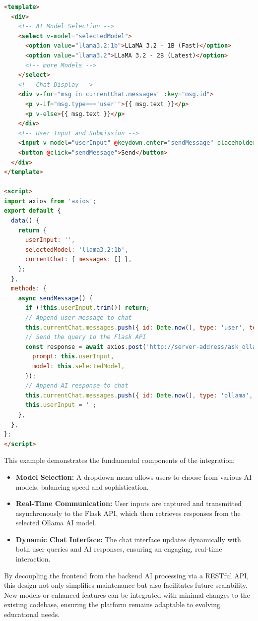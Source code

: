 \begin{lstlisting}[language=html, caption={Abbreviated Vue.js Integration Example}, frame=single]
<template>
  <div>
    <!-- AI Model Selection -->
    <select v-model="selectedModel">
      <option value="llama3.2:1b">LLaMA 3.2 - 1B (Fast)</option>
      <option value="llama3.2">LLaMA 3.2 - 2B (Latest)</option>
      <!-- more Models -->
    </select>
    <!-- Chat Display -->
    <div v-for="msg in currentChat.messages" :key="msg.id">
      <p v-if="msg.type==='user'">{{ msg.text }}</p>
      <p v-else>{{ msg.text }}</p>
    </div>
    <!-- User Input and Submission -->
    <input v-model="userInput" @keydown.enter="sendMessage" placeholder="Ask the AI question..." />
    <button @click="sendMessage">Send</button>
  </div>
</template>

<script>
import axios from 'axios';
export default {
  data() {
    return {
      userInput: '',
      selectedModel: 'llama3.2:1b',
      currentChat: { messages: [] },
    };
  },
  methods: {
    async sendMessage() {
      if (!this.userInput.trim()) return;
      // Append user message to chat
      this.currentChat.messages.push({ id: Date.now(), type: 'user', text: this.userInput });
      // Send the query to the Flask API
      const response = await axios.post('http://server-address/ask_ollama', {
        prompt: this.userInput,
        model: this.selectedModel,
      });
      // Append AI response to chat
      this.currentChat.messages.push({ id: Date.now(), type: 'ollama', text: response.data.choices[0].text });
      this.userInput = '';
    },
  },
};
</script>
\end{lstlisting}

This example demonstrates the fundamental components of the integration:
\begin{itemize}
  \item \textbf{Model Selection:} A dropdown menu allows users to choose from various AI models, balancing speed and sophistication.
  \item \textbf{Real-Time Communication:} User inputs are captured and transmitted asynchronously to the Flask API, which then retrieves responses from the selected Ollama AI model.
  \item \textbf{Dynamic Chat Interface:} The chat interface updates dynamically with both user queries and AI responses, ensuring an engaging, real-time interaction.
\end{itemize}

By decoupling the frontend from the backend AI processing via a RESTful API, this design not only simplifies maintenance but also facilitates future scalability. New models or enhanced features can be integrated with minimal changes to the existing codebase, ensuring the platform remains adaptable to evolving educational needs.

